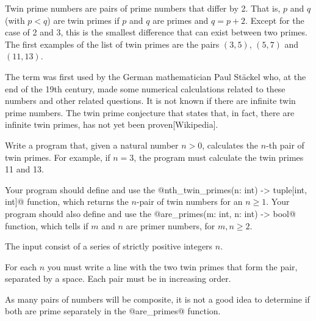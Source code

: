 

\Statement

Twin prime numbers are pairs of prime numbers that differ by 2. That is, $p$ and $q$ (with $p < q$) are twin primes if $p$ and $q$ are primes and $q = p + 2$. Except for the case of 2 and 3, this is the smallest difference that can exist between two primes. The first examples of the list of twin primes are the pairs $(3, 5)$, $(5,7)$ and $(11,13)$.


\medskip

The term was first used by the German mathematician Paul Stäckel who, at the end of the 19th century, made some numerical calculations related to these numbers and other related questions. It is not known if there are infinite twin prime numbers. The twin prime conjecture that states that, in fact, there are infinite twin primes, has not yet been proven[Wikipedia].

\medskip

Write a program that, given a natural number $n>0$, calculates the $n$-th pair of twin primes. For example, if $n = 3$, the program must calculate the twin primes 11 and 13.


\medskip

Your program should define and use the 
@nth_twin_primes(n: int) -> tuple[int, int]@ function,
which returns the $n$-pair of twin numbers for an $n \ge 1$.
Your program should also define and use the 
@are_primes(m: int, n: int) -> bool@ function,
which tells if $m$ and $n$ are primer numbers, for $m,n\ge 2$.


\Input

The input consist of a series of strictly positive integers $n$.

\Output

For each $n$ you must write a line with the two twin primes that form the pair, separated by a space. Each pair must be in increasing order.

\Sample

\Observation

As many pairs of numbers will be composite, it is not a good idea to determine if both are prime separately in the @are_primes@ function.
